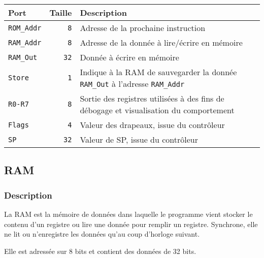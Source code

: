 \documentclass{article}
\begin{document}

    \begin{tabular}{|l|r|l|}
        \hline
        \textbf{Port}        & \textbf{Taille}     & \textbf{Description}                                                                       \\
        \hline

        \hline
        \texttt{ROM\_Addr} & \texttt{8}          & Adresse de la prochaine instruction                                                        \\
        \hline
        \texttt{RAM\_Addr} & \texttt{8}          & Adresse de la donnée à lire/écrire en mémoire                                              \\
        \hline
        \texttt{RAM\_Out}  & \texttt{32}         & Donnée à écrire en mémoire                                                                 \\
        \hline
        \texttt{Store}    & \texttt{1}          & Indique à la RAM de sauvegarder la donnée \texttt{RAM\_Out} à l'adresse \texttt{RAM\_Addr} \\
        \hline
        \texttt{R0-R7}    & \texttt{8\times 32} & Sortie des registres utilisées à des fins de débogage et visualisation du comportement     \\
		\texttt{Flags}    & \texttt{4}          & Valeur des drapeaux, issue du contrôleur \\
        \hline
        \texttt{SP}    & \texttt{32}          & Valeur de SP, issue du contrôleur \\

        \hline
    \end{tabular}

    \subsection{RAM}

    \subsubsection{Description}

    La RAM est la mémoire de données dans laquelle le programme vient stocker le contenu d'un registre ou lire une donnée pour remplir un registre.
    Synchrone, elle ne lit ou n'enregistre les données qu'au coup d'horloge suivant.

    Elle est adressée sur 8 bits et contient des données de 32 bits.
\end{document}
